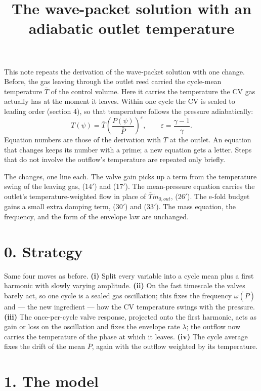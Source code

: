\documentclass[11pt]{article}
\title{The wave-packet solution with an adiabatic outlet temperature}
\author{}
\date{}
\begin{document}
\maketitle

This note repeats the derivation of the wave-packet solution with one change. Before, the gas leaving through the outlet reed carried the cycle-mean temperature $\bar T$ of the control volume. Here it carries the temperature the CV gas actually has at the moment it leaves. Within one cycle the CV is sealed to leading order (section 4), so that temperature follows the pressure adiabatically:
\[
T(\psi) = \bar T\left(\frac{P(\psi)}{\bar P}\right)^{\varepsilon}, \qquad \varepsilon = \frac{\gamma-1}{\gamma} .
\]
Equation numbers are those of the derivation with $\bar T$ at the outlet. An equation that changes keeps its number with a prime; a new equation gets a letter. Steps that do not involve the outflow's temperature are repeated only briefly.

The changes, one line each. The valve gain picks up a term from the temperature swing of the leaving gas, (14$'$) and (17$'$). The mean-pressure equation carries the outlet's temperature-weighted flow in place of $\bar T\dot m_{0,out}$, (26$'$). The e-fold budget gains a small extra damping term, (30$'$) and (33$'$). The mass equation, the frequency, and the form of the envelope law are unchanged.

\section*{0. Strategy}

Same four moves as before. \textbf{(i)} Split every variable into a cycle mean plus a first harmonic with slowly varying amplitude. \textbf{(ii)} On the fast timescale the valves barely act, so one cycle is a sealed gas oscillation; this fixes the frequency $\omega(\bar P)$ and --- the new ingredient --- how the CV temperature swings with the pressure. \textbf{(iii)} The once-per-cycle valve response, projected onto the first harmonic, acts as gain or loss on the oscillation and fixes the envelope rate $\lambda$; the outflow now carries the temperature of the phase at which it leaves. \textbf{(iv)} The cycle average fixes the drift of the mean $\bar P$, again with the outflow weighted by its temperature.

\section*{1. The model}
\end{document}
